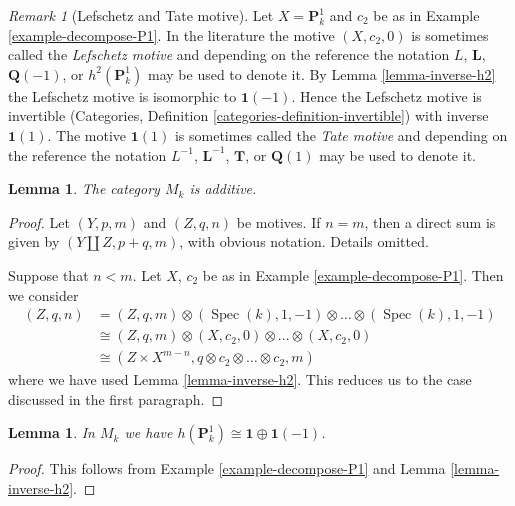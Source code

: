 \documentclass{stacks-project}
\theoremstyle{plain}
\newtheorem{lemma}[subsection]{Lemma}
\theoremstyle{definition}
\theoremstyle{remark}
\newtheorem{remark}[subsection]{Remark}
\numberwithin{equation}{subsection}
\def\Spec{\mathop{\mathrm{Spec}}}
\begin{document}
\begin{remark}[Lefschetz and Tate motive]
\label{remark-lefschetz-tate}
Let $X = \mathbf{P}^1_k$ and $c_2$ be as in Example \ref{example-decompose-P1}.
In the literature the motive $(X, c_2, 0)$ is sometimes called the
{\it Lefschetz motive} and depending on the reference the notation
$L$, $\mathbf{L}$, $\mathbf{Q}(-1)$, or $h^2(\mathbf{P}^1_k)$
may be used to denote it. By Lemma \ref{lemma-inverse-h2} the Lefschetz motive
is isomorphic to $\mathbf{1}(-1)$. Hence the Lefschetz motive is
invertible (Categories, Definition \ref{categories-definition-invertible})
with inverse
$\mathbf{1}(1)$. The motive $\mathbf{1}(1)$ is sometimes called the
{\it Tate motive} and depending on the reference the notation
$L^{-1}$, $\mathbf{L}^{-1}$, $\mathbf{T}$, or $\mathbf{Q}(1)$ may
be used to denote it.
\end{remark}

\begin{lemma}
\label{lemma-additive}
The category $M_k$ is additive.
\end{lemma}

\begin{proof}
Let $(Y, p, m)$ and $(Z, q, n)$ be motives. If $n = m$, then a
direct sum is given by $(Y \amalg Z, p + q, m)$, with obvious notation.
Details omitted.

\medskip\noindent
Suppose that $n < m$. Let $X$, $c_2$ be as in
Example \ref{example-decompose-P1}. Then we consider
\begin{align*}
(Z, q, n)
& =
(Z, q, m) \otimes (\Spec(k), 1, -1) \otimes \ldots \otimes
(\Spec(k), 1, -1) \\
& \cong
(Z, q, m) \otimes (X, c_2, 0) \otimes \ldots \otimes (X, c_2, 0) \\
& \cong
(Z \times X^{m - n}, q \otimes c_2 \otimes \ldots \otimes c_2, m)
\end{align*}
where we have used Lemma \ref{lemma-inverse-h2}.
This reduces us to the case discussed in the first paragraph.
\end{proof}

\begin{lemma}
\label{lemma-decompose-P1}
In $M_k$ we have $h(\mathbf{P}^1_k) \cong \mathbf{1} \oplus \mathbf{1}(-1)$.
\end{lemma}

\begin{proof}
This follows from Example \ref{example-decompose-P1} and
Lemma \ref{lemma-inverse-h2}.
\end{proof}
\end{document}
